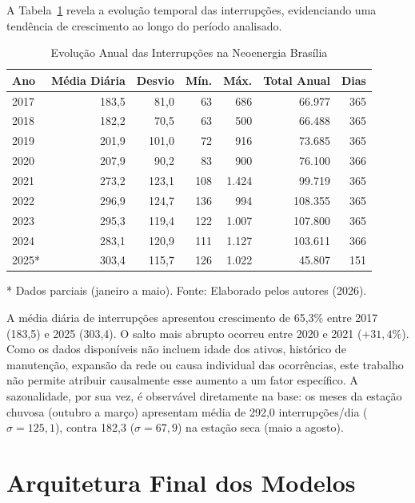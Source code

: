 A Tabela~\ref{tab:descritiva_anual} revela a evolução temporal das interrupções, evidenciando uma tendência de crescimento ao longo do período analisado.

\begin{table}[H]
\caption{Evolução Anual das Interrupções na Neoenergia Brasília}
\label{tab:descritiva_anual}
\begin{center}
\small
\begin{tabular}{lrrrrrr}
\toprule
\textbf{Ano} & \textbf{Média Diária} & \textbf{Desvio} & \textbf{Mín.} & \textbf{Máx.} & \textbf{Total Anual} & \textbf{Dias} \\
\midrule
2017 & 183,5 & 81,0 & 63 & 686 & 66.977 & 365 \\
2018 & 182,2 & 70,5 & 63 & 500 & 66.488 & 365 \\
2019 & 201,9 & 101,0 & 72 & 916 & 73.685 & 365 \\
2020 & 207,9 & 90,2 & 83 & 900 & 76.100 & 366 \\
2021 & 273,2 & 123,1 & 108 & 1.424 & 99.719 & 365 \\
2022 & 296,9 & 124,7 & 136 & 994 & 108.355 & 365 \\
2023 & 295,3 & 119,4 & 122 & 1.007 & 107.800 & 365 \\
2024 & 283,1 & 120,9 & 111 & 1.127 & 103.611 & 366 \\
2025* & 303,4 & 115,7 & 126 & 1.022 & 45.807 & 151 \\
\bottomrule
\end{tabular}
\normalsize
\end{center}
\small{* Dados parciais (janeiro a maio). Fonte: Elaborado pelos autores (2026).}
\end{table}

A média diária de interrupções apresentou crescimento de 65,3\% entre 2017 (183,5) e 2025 (303,4). O salto mais abrupto ocorreu entre 2020 e 2021 ($+31{,}4\%$). Como os dados disponíveis não incluem idade dos ativos, histórico de manutenção, expansão da rede ou causa individual das ocorrências, este trabalho não permite atribuir causalmente esse aumento a um fator específico. A sazonalidade, por sua vez, é observável diretamente na base: os meses da estação chuvosa (outubro a março) apresentam média de 292,0 interrupções/dia ($\sigma = 125{,}1$), contra 182,3 ($\sigma = 67{,}9$) na estação seca (maio a agosto).

\section{Arquitetura Final dos Modelos}\label{sec:arquitetura_final}

